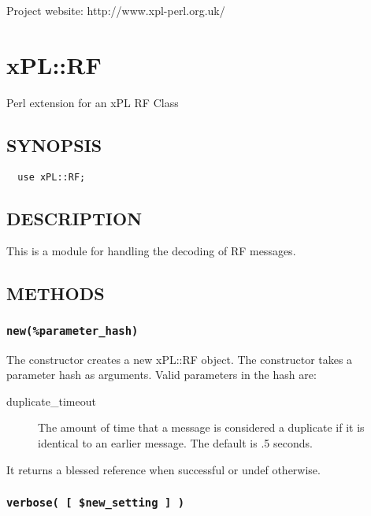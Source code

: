 \documentclass[12pt,a4paper]{article}
\begin{document}
Project website: http://www.xpl-perl.org.uk/

\newpage
\section{xPL::RF\label{xPL::RF}}


Perl extension for an xPL RF Class

\subsection*{SYNOPSIS\label{xPL::RF_SYNOPSIS}}
\begin{verbatim}
  use xPL::RF;
\end{verbatim}
\subsection*{DESCRIPTION\label{xPL::RF_DESCRIPTION}}


This is a module for handling the decoding of RF messages.

\subsection*{METHODS\label{xPL::RF_METHODS}}
\subsubsection*{\texttt{new(\%parameter\_hash)}\label{xPL::RF_new_parameter_hash_}}


The constructor creates a new xPL::RF object.  The constructor takes a
parameter hash as arguments.  Valid parameters in the hash are:

\begin{description}

\item[{duplicate\_timeout}] \mbox{}

The amount of time that a message is considered a duplicate if it
is identical to an earlier message.  The default is .5 seconds.

\end{description}


It returns a blessed reference when successful or undef otherwise.

\subsubsection*{\texttt{verbose( [ \$new\_setting ] )}\label{xPL::RF_verbose_new_setting_}}
\end{document}
